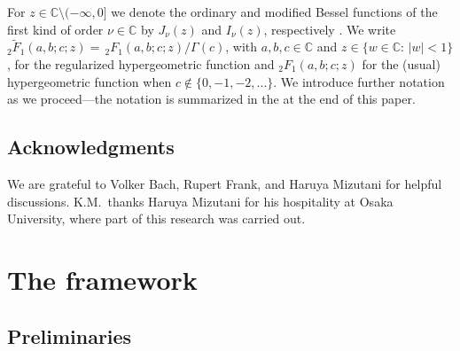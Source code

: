 \documentclass[12pt,reqno]{amsart}
\theoremstyle{definition}
\theoremstyle{remark}
\numberwithin{equation}{section}
\newcommand{\1}{\mathbbm{1}}
\newcommand{\C}{\mathbb{C}}
\begin{document}
\medskip
For $z\in\C\setminus(-\infty,0]$ we denote the ordinary and modified Bessel functions of the first kind of order $\nu\in\C$ by $J_\nu(z)$ and $I_\nu(z)$, respectively \cite[(10.2.2), (10.25.2)]{NIST:DLMF}.
We write $_2\tilde F_1(a,b;c;z) =\, _2F_1(a,b;c;z)/\Gamma(c)$, with $a,b,c\in\C$ and $z\in\{w\in\C:\,|w|<1\}$, for the regularized hypergeometric function \cite[(15.2.1)]{NIST:DLMF} and $_2F_1(a,b;c;z)$ for the (usual) hypergeometric function \cite[(15.2.2)]{NIST:DLMF} when $c\notin\{0,-1,-2,...\}$.
We introduce further notation as we proceed---the notation is summarized in the \hyperref[index]{\indexname} at the end of this paper.

\subsection*{Acknowledgments}
We are grateful to Volker Bach, Rupert Frank, and Haruya Mizutani for helpful discussions.
K.M.~thanks Haruya Mizutani for his hospitality at Osaka University, where part of this research was carried out.


\section{The framework}
\label{s:framework}
\subsection{Preliminaries}
\label{ss:preliminaries}
\end{document}
